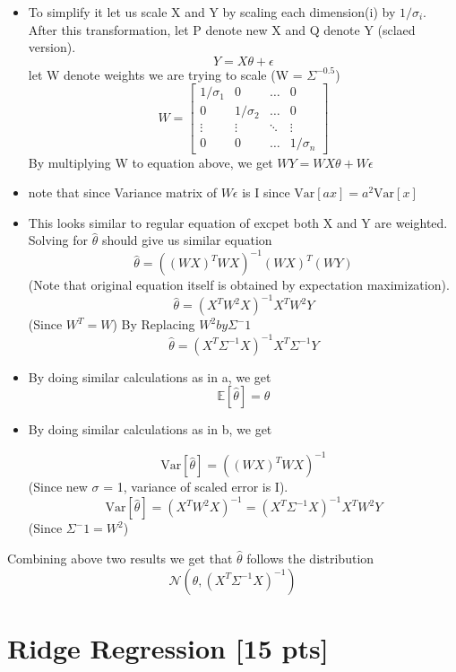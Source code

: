 \documentclass[twoside,10pt]{article}
\begin{document}
\begin{itemize}
	\item To simplify it let us scale X and Y by scaling each dimension(i) by $1/\sigma_i$. After this transformation, let P denote new X and Q denote Y (sclaed version). 
    $$ Y = X \theta + \epsilon $$ 
    let W denote weights we are trying to scale (W = $\Sigma^{-0.5}$)
\begin{equation}
    W = \begin{bmatrix}
1/\sigma_1 & 0 & \dots & 0\\
0 & 1/\sigma_2& \dots & 0\\
\vdots & \vdots & \ddots & \vdots\\
0 & 0 & \dots & 1/\sigma_n
\end{bmatrix}\nonumber
\end{equation}
By multiplying W to equation above, we get
 $ WY = WX\theta + W\epsilon $
 \item note that since Variance matrix of $W\epsilon$ is I since $\text{Var}[ax] = a^2\text{Var}[x]$
 \item This looks similar to regular equation of excpet both X and Y are weighted. Solving for $\hat{\theta}$ should give us similar equation 
 $$\hat{\theta} = ((WX)^TWX)^{-1}(WX)^T(WY)$$ (Note that original equation itself is obtained by expectation maximization).
 $$\hat{\theta} = (X^T W^2 X)^{-1} X^T W^2 Y $$ (Since $W^T = W$)
By Replacing $W^2 by \Sigma ^-1$
 $$\boxed{\hat{\theta} = (X^T \Sigma^{-1} X)^{-1} X^T \Sigma^{-1} Y} $$
 \item By doing similar calculations as in a, we get 
 $$\mathbb{E}[\hat{\theta}] = \theta $$
 \item By doing similar calculations as in b, we get
 
 $$\text{Var}[\hat{\theta}] = ((WX)^T WX)^{-1}$$ (Since new $\sigma$ = 1, variance of scaled error is I).
 $$ \text{Var}[\hat{\theta}] = (X^T W^2 X)^{-1}  = (X^T \Sigma^{-1} X)^{-1} X^T W^2 Y$$ (Since $\Sigma^-1 = W^2$)
    
\end{itemize}
Combining above two results we get that $\hat{\theta}$ follows the distribution 
\begin{equation}\boxed{ \mathcal{N} (\theta, (X^T \Sigma^{-1} X)^{-1})  }
\end{equation}


\newpage
\section{Ridge Regression [15 pts]}
\end{document}
